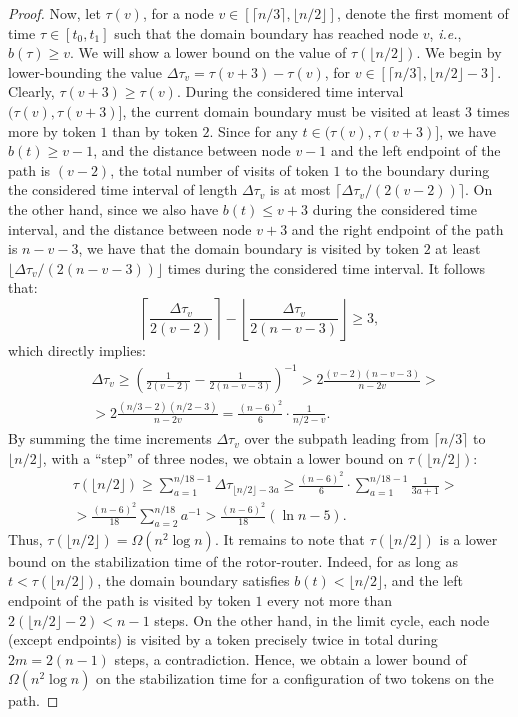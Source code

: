 \documentclass{article}[11pt,letter]
\newcommand{\ie}{{\it i.e.}\xspace}
\begin{document}
\begin{proof}
Now, let $\tau(v)$, for a node $v\in [\lceil n/3\rceil,\lfloor n/2 \rfloor]$, denote the first moment of time $\tau\in [t_0, t_1]$ such that the domain boundary has reached node $v$, \ie, $b(\tau) \geq v$. We will show a lower bound on the value of $\tau(\lfloor n/2\rfloor)$. We begin by lower-bounding the value $\Delta \tau_v = \tau(v+3) - \tau(v)$, for $v\in [\lceil n/3\rceil,\lfloor n/2 \rfloor  - 3]$. Clearly, $\tau(v+3) \geq \tau(v)$. During the considered time interval $(\tau(v),\tau(v+3)]$, the current domain boundary must be visited at least $3$ times more
by token $1$ than by token $2$. Since for any $t\in(\tau(v),\tau(v+3)]$, we have $b(t) \geq v-1$, and the distance between node $v-1$ and the left endpoint of the path is $(v-2)$, the total number of visits of token $1$ to the boundary during the considered time interval of length $\Delta \tau_v$ is at most $\lceil \Delta \tau_v / (2(v-2))\rceil$. On the other hand, since we also have $b(t) \leq v+3$ during the considered time interval, and the distance between node $v+3$ and the right endpoint of the path is $n-v-3$, we have that the domain boundary is visited by token $2$ at least $\lfloor \Delta \tau_v / (2(n-v-3))\rfloor$ times during the considered time interval. It follows that:
\begin{equation}
\left\lceil \frac{\Delta \tau_v}{2(v-2)}\right\rceil - \left\lfloor \frac{\Delta \tau_v}{2(n-v-3)}\right\rfloor \geq 3,\label{eq:lbound}
\end{equation}
which directly implies:
\begin{align*}
&\Delta \tau_v \geq \left(\frac{1}{2(v-2)} - \frac{1}{2(n-v-3)}\right)^{-1} > 2 \frac{(v-2)(n-v-3)}{n-2v} >\\&> 2 \frac{(n/3-2)(n/2-3)}{n-2v} = \frac{(n-6)^2}{6}\cdot\frac{1}{n/2 - v}.
\end{align*}
By summing the time increments $\Delta \tau_v$ over the subpath leading from $\lceil n/3\rceil$ to $\lfloor n/2 \rfloor$, with a ``step'' of three nodes, we obtain a lower bound on $\tau(\lfloor n/2\rfloor)$:
\begin{align*}
&\tau(\lfloor n/2\rfloor) \geq \sum_{a = 1}^{n/18 - 1} \Delta\tau_{\lfloor n/2 \rfloor  - 3a} \geq \frac{(n-6)^2}{6} \cdot \sum_{a = 1}^{n/18 - 1} \frac{1}{3a+1} >\\&> \frac{(n-6)^2}{18} \sum_{a = 2}^{n/18} a^{-1} > \frac{(n-6)^2}{18}(\ln n - 5).
\end{align*}
Thus, $\tau(\lfloor n/2\rfloor) = \Omega (n^2 \log n)$. It remains to note that $\tau(\lfloor n/2\rfloor)$ is a lower bound on the stabilization time of the rotor-router. Indeed, for as long as $t < \tau(\lfloor n/2\rfloor )$, the domain boundary satisfies $b(t) < \lfloor n/2\rfloor$, and the left endpoint of the path is visited by token $1$ every not more than $2(\lfloor n/2\rfloor -2) < n-1$ steps. On the other hand, in the limit cycle, each node (except endpoints) is visited by a token precisely twice in total during $2m = 2(n-1)$ steps, a contradiction. Hence, we obtain a lower bound of $\Omega (n^2 \log n)$ on the stabilization time for a configuration of two tokens on the path.


\end{proof}
\end{document}
